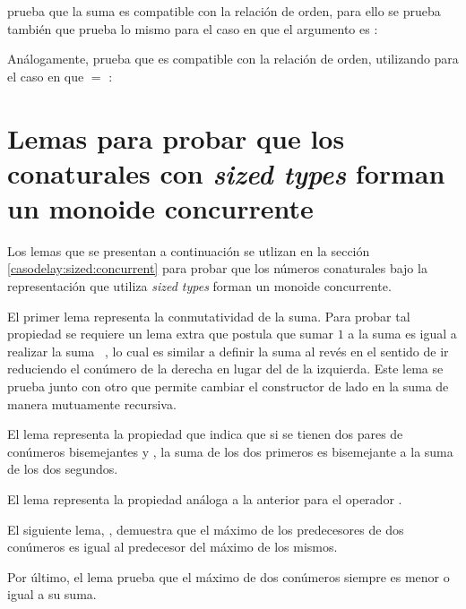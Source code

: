  prueba que la suma es compatible con la relación de orden, para ello se prueba también  que prueba lo mismo para el caso en que el argumento  es :

Análogamente,  prueba que  es compatible con la relación de orden, utilizando  para el caso en que  $=$ :

\section{Lemas para probar que los conaturales con \textit{sized types} forman un monoide concurrente}\label{apendice:lemassz}

Los lemas que se presentan a continuación se utlizan en la sección \ref{casodelay:sized:concurrent} para probar que los números conaturales bajo la representación que utiliza \textit{sized types} forman un monoide concurrente.

El primer lema representa la conmutatividad de la suma. Para probar tal propiedad se requiere un lema extra que postula que sumar $1$ a la suma  \AgdaFunction{+}   es igual a realizar la suma \hbox{ \AgdaFunction{+}  }, lo cual es similar a definir la suma al revés en el sentido de ir reduciendo el conúmero de la derecha en lugar del de la izquierda. Este lema se prueba junto con otro que permite cambiar el constructor  de lado en la suma de manera mutuamente recursiva.

El lema  representa la propiedad que indica que si se tienen dos pares de conúmeros bisemejantes  \AgdaFunction{$\sim$}  y  \AgdaFunction{$\sim$} , la suma de los dos primeros es bisemejante a la suma de los dos segundos.

El lema  representa la propiedad análoga a la anterior para el operador .

El siguiente lema, , demuestra que el máximo de los predecesores de dos conúmeros es igual al predecesor del máximo de los mismos.

Por último, el lema  prueba que el máximo de dos conúmeros siempre es menor o igual a su suma.
